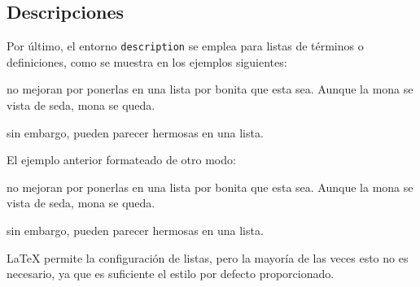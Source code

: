 \documentclass[11pt,a4paper]{article}
\begin{document}
\subsection{Descripciones}\label{sec:descripciones}
\noindent Por último, el entorno {\tt description} se emplea para listas de términos o definiciones, como se muestra en los ejemplos siguientes:

\begin{description}[noitemsep]
	\item[Estupideces] no mejoran por ponerlas en una lista por bonita que esta sea. Aunque la mona se vista de seda, mona se queda.
	\item[Lucideces] sin embargo, pueden parecer hermosas en
	una lista.
\end{description}

\noindent El ejemplo anterior formateado de otro modo:

\begin{description}[style=nextline]
	\item[Estupideces] no mejoran por ponerlas en una lista por bonita que esta sea. Aunque la mona se vista de seda, mona se queda.
	\item[Lucideces] sin embargo, pueden parecer hermosas en una lista.
\end{description}

\LaTeX{} permite la configuración de listas, pero la mayoría de las veces esto no es necesario, ya que es suficiente el estilo por defecto proporcionado.
\end{document}
